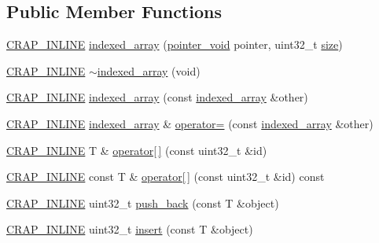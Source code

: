 \subsection*{Public Member Functions}
\begin{DoxyCompactItemize}
\item 
\hyperlink{config__x86_8h_a5a40526b8d842e7ff731509998bb0f1c}{C\+R\+A\+P\+\_\+\+I\+N\+L\+I\+N\+E} \hyperlink{classcrap_1_1indexed__array_a0121c2ef3faa6ecc80d74ce45d4ef7c8}{indexed\+\_\+array} (\hyperlink{classcrap_1_1indexed__array_a8590198c1f75bc14843f09c491a446e9}{pointer\+\_\+void} pointer, uint32\+\_\+t \hyperlink{classcrap_1_1indexed__array_a1ac98bff03a0d2b8fafb5fde8102cf12}{size})
\item 
\hyperlink{config__x86_8h_a5a40526b8d842e7ff731509998bb0f1c}{C\+R\+A\+P\+\_\+\+I\+N\+L\+I\+N\+E} \hyperlink{classcrap_1_1indexed__array_a78715475a2dc120cc9f662308b25c0fc}{$\sim$indexed\+\_\+array} (void)
\item 
\hyperlink{config__x86_8h_a5a40526b8d842e7ff731509998bb0f1c}{C\+R\+A\+P\+\_\+\+I\+N\+L\+I\+N\+E} \hyperlink{classcrap_1_1indexed__array_af1d70c02662c8c5f02f8ed85819ed10b}{indexed\+\_\+array} (const \hyperlink{classcrap_1_1indexed__array}{indexed\+\_\+array} \&other)
\item 
\hyperlink{config__x86_8h_a5a40526b8d842e7ff731509998bb0f1c}{C\+R\+A\+P\+\_\+\+I\+N\+L\+I\+N\+E} \hyperlink{classcrap_1_1indexed__array}{indexed\+\_\+array} \& \hyperlink{classcrap_1_1indexed__array_ad2d8756225ace11cc732be55def9fa70}{operator=} (const \hyperlink{classcrap_1_1indexed__array}{indexed\+\_\+array} \&other)
\item 
\hyperlink{config__x86_8h_a5a40526b8d842e7ff731509998bb0f1c}{C\+R\+A\+P\+\_\+\+I\+N\+L\+I\+N\+E} T \& \hyperlink{classcrap_1_1indexed__array_ac3b52ad3a4bd642e6035cb88477b7344}{operator\mbox{[}$\,$\mbox{]}} (const uint32\+\_\+t \&id)
\item 
\hyperlink{config__x86_8h_a5a40526b8d842e7ff731509998bb0f1c}{C\+R\+A\+P\+\_\+\+I\+N\+L\+I\+N\+E} const T \& \hyperlink{classcrap_1_1indexed__array_ae974395e629c2825fc4480a54e6d7855}{operator\mbox{[}$\,$\mbox{]}} (const uint32\+\_\+t \&id) const 
\item 
\hyperlink{config__x86_8h_a5a40526b8d842e7ff731509998bb0f1c}{C\+R\+A\+P\+\_\+\+I\+N\+L\+I\+N\+E} uint32\+\_\+t \hyperlink{classcrap_1_1indexed__array_a89575aa1f42788edc2aab95297dcd6c0}{push\+\_\+back} (const T \&object)
\item 
\hyperlink{config__x86_8h_a5a40526b8d842e7ff731509998bb0f1c}{C\+R\+A\+P\+\_\+\+I\+N\+L\+I\+N\+E} uint32\+\_\+t \hyperlink{classcrap_1_1indexed__array_a496146e2513dee4859d3ef70839c5ea9}{insert} (const T \&object)

\end{DoxyCompactItemize}

